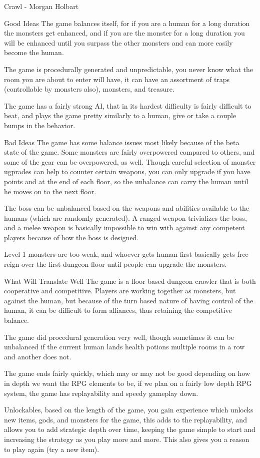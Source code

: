 \documentclass[12pt]{report}
\begin{document}
\begin{section}{Crawl - Morgan Holbart}
\begin{subsection}{Good Ideas}
The game balances itself, for if you are a human for a long duration the
monsters get enhanced, and if you are the monster for a long duration you
will be enhanced until you surpass the other monsters and can more easily
become the human.

The game is procedurally generated and unpredictable, you never know what
the room you are about to enter will have, it can have an assortment of
traps (controllable by monsters also), monsters, and treasure.

The game has a fairly strong AI, that in its hardest difficulty is fairly
difficult to beat, and plays the game pretty similarly to a human, give or
take a couple bumps in the behavior.
\end{subsection}

\begin{subsection}{Bad Ideas}
The game has some balance issues most likely because of the beta state of
the game. Some monsters are fairly  overpowered compared to others, and
some of the gear can be overpowered, as well. Though careful selection of
monster ugprades can help to counter certain weapons, you can only upgrade
if you have points and at the end of each floor, so the unbalance can
carry the human until he moves on to the next floor.

The boss can be unbalanced based on the weapons and abilities available to
the humans (which are randomly generated). A ranged weapon trivializes the
boss, and a melee weapon is basically impossible to win with against any
competent players because of how the boss is designed.

Level 1 monsters are too weak, and whoever gets human first basically gets
free reign over the first dungeon floor until people can upgrade the
monsters.
\end{subsection}

\begin{subsection}{What Will Translate Well}
The game is a floor based dungeon crawler that is both cooperative and
competitive. Players are working together as monsters, but against the
human, but because of the turn based nature of having control of the human,
it can be difficult to form alliances, thus retaining the competitive
balance. 

The game did procedural generation very well, though sometimes it can be
unbalanced if the current human lands health potions multiple rooms in a
row and another does not.

The game ends fairly quickly, which may or may not be good depending on how
in depth we want the RPG elements to be, if we plan on a fairly low depth
RPG system, the game has replayability and speedy gameplay down.

Unlockables, based on the length of the game, you gain experience which
unlocks new items, gods, and monsters for the game, this adds to the
replayability, and allows you to add strategic depth over time, keeping the
game simple to start and increasing the strategy as you play more and more.
This also gives you a reason to play again (try a new item).
\end{subsection}
\end{section}
\end{document}
